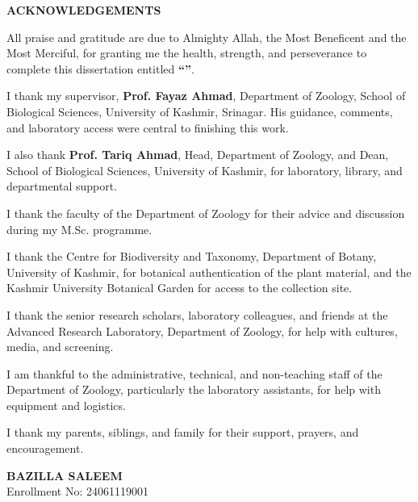 
\clearpage
\thispagestyle{frontmatterstyle}
\begin{center}
{\Large \bfseries ACKNOWLEDGEMENTS\par}
\vspace{0.3in}
\end{center}

\noindent All praise and gratitude are due to Almighty Allah, the Most Beneficent and the Most Merciful, for granting me the health, strength, and perseverance to complete this dissertation entitled \textbf{``\distitlecite''}.

\vspace{0.15in}

\noindent I thank my supervisor, \textbf{Prof. Fayaz Ahmad}, Department of Zoology, School of Biological Sciences, University of Kashmir, Srinagar. His guidance, comments, and laboratory access were central to finishing this work.

\vspace{0.15in}

\noindent I also thank \textbf{Prof. Tariq Ahmad}, Head, Department of Zoology, and Dean, School of Biological Sciences, University of Kashmir, for laboratory, library, and departmental support.

\vspace{0.15in}

\noindent I thank the faculty of the Department of Zoology for their advice and discussion during my M.Sc. programme.

\vspace{0.15in}

\noindent I thank the Centre for Biodiversity and Taxonomy, Department of Botany, University of Kashmir, for botanical authentication of the plant material, and the Kashmir University Botanical Garden for access to the collection site.

\vspace{0.15in}

\noindent I thank the senior research scholars, laboratory colleagues, and friends at the Advanced Research Laboratory, Department of Zoology, for help with cultures, media, and screening.

\vspace{0.15in}

\noindent I am thankful to the administrative, technical, and non-teaching staff of the Department of Zoology, particularly the laboratory assistants, for help with equipment and logistics.

\vspace{0.15in}

\noindent I thank my parents, siblings, and family for their support, prayers, and encouragement.

\vspace{0.5in}

\noindent
\begin{flushright}
\textbf{BAZILLA SALEEM}\\
Enrollment No: 24061119001
\end{flushright}

